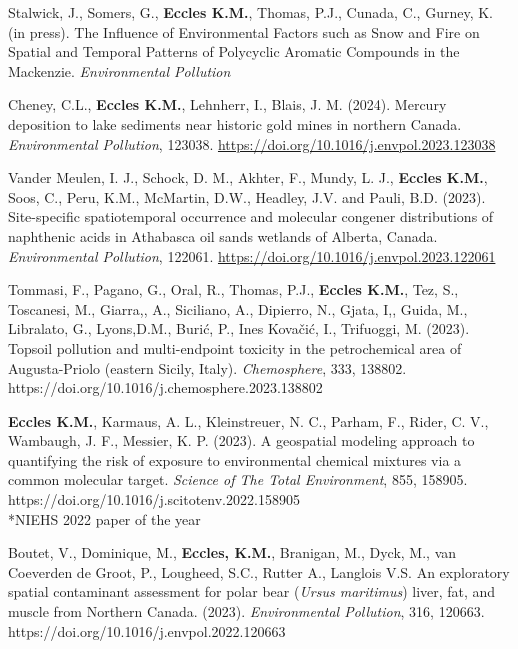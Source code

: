 \documentclass[margin,line]{res}
\begin{document}
\begin{resume}
\begin{etaremune}[start=25]

\item Stalwick, J., Somers, G., \textbf{Eccles K.M.}, Thomas, P.J., Cunada, C., Gurney, K. (in press). The Influence of Environmental Factors such as Snow and Fire on Spatial and Temporal Patterns of Polycyclic Aromatic Compounds in the Mackenzie. \textit{Environmental Pollution}

\item Cheney, C.L., \textbf{Eccles K.M.}, Lehnherr, I., Blais, J. M. (2024). Mercury deposition to lake sediments near historic gold mines in northern Canada. \textit{Environmental Pollution}, 123038. \url{https://doi.org/10.1016/j.envpol.2023.123038}

\item Vander Meulen, I. J., Schock, D. M., Akhter, F., Mundy, L. J., \textbf{Eccles K.M.}, Soos, C., Peru, K.M., McMartin, D.W., Headley, J.V. and Pauli, B.D. (2023). Site-specific spatiotemporal occurrence and molecular congener distributions of naphthenic acids in Athabasca oil sands wetlands of Alberta, Canada. \textit{Environmental Pollution}, 122061. \url{https://doi.org/10.1016/j.envpol.2023.122061}

\item Tommasi, F., Pagano, G., Oral, R., Thomas, P.J., \textbf{Eccles K.M.}, Tez, S., Toscanesi, M., Giarra,, A., Siciliano, A., Dipierro, N., Gjata, I,, Guida, M., Libralato, G., Lyons,D.M., Burić, P., Ines Kovačić, I.,  Trifuoggi, M. (2023). Topsoil pollution and multi-endpoint toxicity in the petrochemical area of Augusta-Priolo (eastern Sicily, Italy). \textit{Chemosphere}, 333, 138802. https://doi.org/10.1016/j.chemosphere.2023.138802

\item \textbf{Eccles K.M.}, Karmaus, A. L., Kleinstreuer, N. C., Parham, F., Rider, C. V., Wambaugh, J. F., Messier, K. P. (2023). A geospatial modeling approach to quantifying the risk of exposure to environmental chemical mixtures via a common molecular target. \textit{Science of The Total Environment}, 855, 158905. https://doi.org/10.1016/j.scitotenv.2022.158905\\
\mbox{*}NIEHS 2022 paper of the year

\item Boutet, V., Dominique, M., \textbf{Eccles, K.M.}, Branigan, M., Dyck, M., van Coeverden de Groot, P., Lougheed, S.C., Rutter A., Langlois V.S. An exploratory spatial contaminant assessment for polar bear (\textit{Ursus maritimus}) liver, fat, and muscle from Northern Canada. (2023). \textit{Environmental Pollution},  316, 120663. https://doi.org/10.1016/j.envpol.2022.120663


\end{etaremune}
\end{resume}
\end{document}
